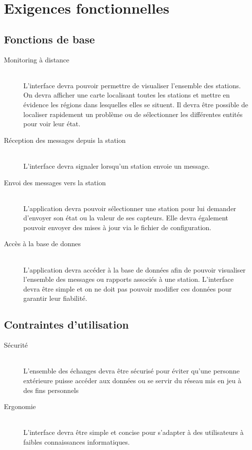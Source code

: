 
\section{Exigences fonctionnelles}

\subsection{Fonctions de base}

\begin{description}
	\item[ Monitoring à distance]\hfill\\
		L'interface devra pouvoir permettre de visualiser l'ensemble des stations. On devra afficher une carte localisant toutes les stations et mettre en évidence les régions dans lesquelles elles se situent. Il devra être possible de localiser rapidement un problème ou de sélectionner les différentes entités pour voir leur état.\\

	\item [Réception des messages depuis la station]\hfill\\
		L'interface devra signaler lorsqu'un station envoie un message. \\

	\item [Envoi des messages vers la station]\hfill\\
		L'application devra pouvoir sélectionner une station pour lui demander d'envoyer son état ou la valeur de ses capteurs. Elle devra également pouvoir envoyer des mises à jour via le fichier de configuration.\\

	\item [Accès à la base de donnes]\hfill\\
		L'application devra accéder à la base de données afin de pouvoir visualiser l'ensemble des messages ou rapports associés à une station. L'interface devra être simple et on ne doit pas pouvoir modifier ces données pour garantir leur fiabilité.
\end{description}


\subsection{Contraintes d'utilisation}

\begin{description}
	\item [Sécurité]\hfill\\
		L'ensemble des échanges devra être sécurisé pour éviter qu'une personne extérieure puisse accéder aux données ou se servir du réseau mis en jeu à des fins personnels\\

	\item [Ergonomie]\hfill\\
		L'interface devra être simple et concise pour s'adapter à des utilisateurs à faibles connaissances informatiques.\\
\end{description}	
	

